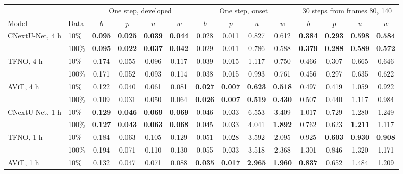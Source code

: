 \documentclass[11pt]{article}
\begin{document}
\begin{table}[!htbp]
\centering\footnotesize
\setlength{\tabcolsep}{3.0pt}
\begin{tabular}{@{}llcccccccccccc@{}}
\toprule
& & \multicolumn{4}{c}{One step, developed} & \multicolumn{4}{c}{One step, onset} & \multicolumn{4}{c}{30 steps from frames 80, 140} \\
\cmidrule(lr){3-6}\cmidrule(lr){7-10}\cmidrule(l){11-14}
Model & Data & $b$ & $p$ & $u$ & $w$ & $b$ & $p$ & $u$ & $w$ & $b$ & $p$ & $u$ & $w$ \\
\midrule
CNextU-Net, 4 h & 10\% & \textbf{0.095} & \textbf{0.025} & \textbf{0.039} & \textbf{0.044} & 0.028 & 0.011 & 0.827 & 0.612 & \textbf{0.384} & \textbf{0.293} & \textbf{0.598} & \textbf{0.584} \\
                & 100\% & \textbf{0.095} & \textbf{0.022} & \textbf{0.037} & \textbf{0.042} & 0.029 & 0.011 & 0.786 & 0.588 & \textbf{0.379} & \textbf{0.288} & \textbf{0.589} & \textbf{0.572} \\
TFNO, 4 h & 10\% & 0.174 & 0.055 & 0.096 & 0.117 & 0.039 & 0.015 & 1.117 & 0.750 & 0.466 & 0.307 & 0.665 & 0.646 \\
          & 100\% & 0.171 & 0.052 & 0.093 & 0.114 & 0.038 & 0.015 & 0.993 & 0.761 & 0.456 & 0.297 & 0.635 & 0.622 \\
AViT, 4 h & 10\% & 0.122 & 0.040 & 0.061 & 0.081 & \textbf{0.027} & \textbf{0.007} & \textbf{0.623} & \textbf{0.518} & 0.497 & 0.419 & 1.059 & 0.922 \\
          & 100\% & 0.109 & 0.031 & 0.050 & 0.064 & \textbf{0.026} & \textbf{0.007} & \textbf{0.519} & \textbf{0.430} & 0.507 & 0.440 & 1.117 & 0.984 \\
\midrule
CNextU-Net, 1 h & 10\% & \textbf{0.129} & \textbf{0.046} & \textbf{0.069} & \textbf{0.069} & 0.046 & 0.033 & 6.553 & 3.409 & 1.017 & 0.729 & 1.280 & 1.249 \\
                & 100\% & \textbf{0.127} & \textbf{0.043} & \textbf{0.063} & \textbf{0.068} & 0.045 & 0.033 & 4.041 & \textbf{1.892} & 0.762 & 0.623 & \textbf{1.211} & 1.117 \\
TFNO, 1 h & 10\% & 0.184 & 0.063 & 0.105 & 0.129 & 0.051 & 0.028 & 3.592 & 2.095 & 0.925 & \textbf{0.603} & \textbf{0.930} & \textbf{0.908} \\
          & 100\% & 0.194 & 0.071 & 0.110 & 0.130 & 0.055 & 0.033 & 3.518 & 2.368 & 1.301 & 0.846 & 1.320 & 1.171 \\
AViT, 1 h & 10\% & 0.132 & 0.047 & 0.071 & 0.088 & \textbf{0.035} & \textbf{0.017} & \textbf{2.965} & \textbf{1.960} & \textbf{0.837} & 0.652 & 1.484 & 1.209 \\

\end{tabular}
\end{table}
\end{document}
